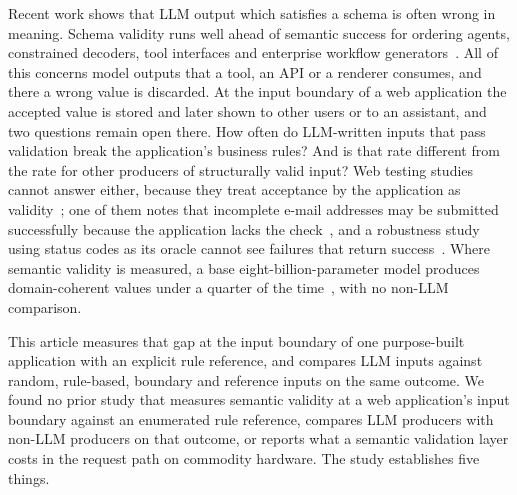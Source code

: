 \documentclass[journal]{IEEEtran}
\begin{document}
Recent work shows that LLM output which satisfies a schema is often wrong in meaning. Schema validity
runs well ahead of semantic success for ordering agents, constrained decoders, tool interfaces and
enterprise workflow
generators~\cite{li2026orderbench,ray2026constrainttax,singh2026sob,sigdel2026schemafirst,wrenn2026enterprise}.
All of this concerns model outputs that a tool, an API or a renderer consumes, and there a wrong value
is discarded. At the input boundary of a web application the accepted value is stored and later shown
to other users or to an assistant, and two questions remain open there. How often do LLM-written inputs that pass validation
break the application's business rules? And is that rate different from the rate for other producers of
structurally valid input? Web testing studies cannot answer either, because they treat acceptance by the
application as validity~\cite{li2026webformtest,alian2024formnexus}; one of them notes that incomplete
e-mail addresses may be submitted successfully because the application lacks the
check~\cite{li2026webformtest}, and a robustness study using status codes as its oracle cannot see
failures that return success~\cite{tigulla2026robustness}. Where semantic validity is measured, a base
eight-billion-parameter model produces domain-coherent values under a quarter of the
time~\cite{kim2025llamaresttest}, with no non-LLM comparison.

This article measures that gap at the input boundary of one purpose-built application with an explicit
rule reference, and compares LLM inputs against random, rule-based, boundary and reference inputs on
the same outcome. We found no prior study that measures semantic validity at a web application's input
boundary against an enumerated rule reference, compares LLM producers with non-LLM producers on that
outcome, or reports what a semantic validation layer costs in the request path on commodity hardware.
The study establishes five things.
\end{document}
